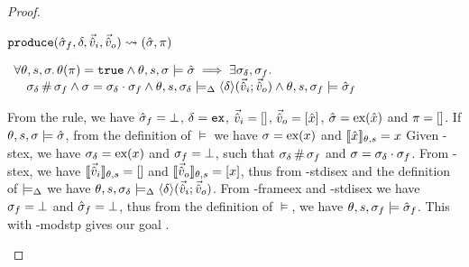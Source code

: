 \begin{proof}

\pfassume \begin{hypvlist}
 $\texttt{produce}(\hat{\sigma}_f,\delta,\vec{\hat{v}}_i,\vec{\hat{v}}_o)\rightsquigarrow (\hat{\sigma}, \pi)$
\end{hypvlist}
\pfprove \begin{goalvlist}
 $\begin{array}{l}
\forall\theta,s,\sigma\ldotp \theta(\pi)=\texttt{true} \land \theta,s,\sigma\models\hat{\sigma} \implies \exists \sigma_\delta, \sigma_f\ldotp \\
\quad \sigma_\delta\operatorname{\#}\sigma_f \land \sigma=\sigma_\delta\cdot\sigma_f \land \theta,s,\sigma_\delta \models_{\Delta} \left<\delta\right>\!(\vec{\hat{v}}_i;\vec{\hat{v}}_o) \land \theta,s,\sigma_f \models \hat{\sigma}_f
\end{array}$
\end{goalvlist}
\begin{hypvlist}
 From the \produce{} rule, we have $\hat{\sigma}_f=\bot$, $\delta=\texttt{ex}$, $\vec{\hat{v}}_i=[]$, $\vec{\hat{v}}_o=[\hat{x}]$, $\hat{\sigma}=\text{ex}(\hat{x})$ and $\pi=[]$.
 If $\theta,s,\sigma\models\hat{\sigma}$, from the definition of $\models$ we have $\sigma=\text{ex}(x)$ and $\llbracket\hat{x}\rrbracket_{\theta,s}=x$
 Given \hyp{stex}, we have $\sigma_\delta=\text{ex}(x)$ and $\sigma_f=\bot$, such that $\sigma_\delta\operatorname{\#}\sigma_f$ and $\sigma=\sigma_\delta\cdot\sigma_f$.
 From \hyp{stex}, we have $\llbracket\vec{\hat{v}}_i\rrbracket_{\theta,s}=[]$ and $\llbracket\vec{\hat{v}}_o\rrbracket_{\theta,s}=[x]$, thus from \hyp{stdisex} and the definition of $\models_{\Delta}$ we have $\theta,s,\sigma_\delta\models_{\Delta}\left<\delta\right>\!(\vec{\hat{v}}_i;\vec{\hat{v}}_o)$.
 From \hyp{frameex} and \hyp{stdisex} we have $\sigma_f=\bot$ and $\hat{\sigma}_f=\bot$, thus from the definition of $\models$, we have $\theta,s,\sigma_f\models\hat{\sigma}_f$. This with \hyp{modstp} gives our goal .
\end{hypvlist}



\end{proof}
